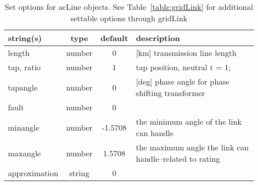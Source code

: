 \begin{table}[ht]
\centering
\begin{tabular}{p{5cm} c c p{7cm}}
\hline
string(s) & type & default & description \\
\hline
length & number & 0 & [km] transmission line length\\
tap, ratio & number & 1 & tap position, neutral t = 1;\\
tapangle & number & 0 & [deg] phase angle for phase shifting transformer\\
fault & number & 0 & \\
minangle & number & -1.5708 & the minimum angle of the link can handle\\
maxangle & number & 1.5708 & the maximum angle the link can handle--related to rating\\
approximation & string & 0 & \\
\hline
\end{tabular}
\caption{Set options for acLine objects. See Table~\ref{table:gridLink} for additional settable options through gridLink}
\label{table:acLine}
\end{table}

